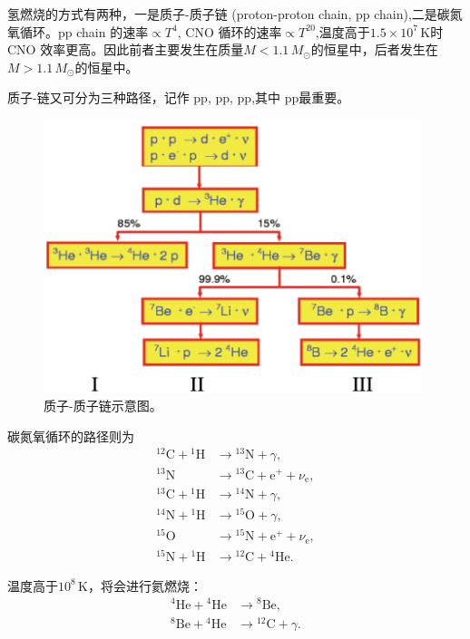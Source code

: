 \documentclass[../天体物理基础.tex]{subfiles}
\begin{document}
氢燃烧的方式有两种，一是质子{}-{}质子链 (proton-proton chain, pp chain),二是碳氮氧循环。pp chain 的速率$\propto T^{4}$, CNO 循环的速率$\propto{}T^{20}$,温度高于$1.5\times10^{7}\,\mathrm{K}$时 CNO 效率更高。因此前者主要发生在质量$M<1.1\,M_{\odot}$的恒星中，后者发生在$M>1.1\,M_{\odot}$的恒星中。

质子{}-{}链又可分为三种路径，记作 pp\uppercase\expandafter{}, pp\uppercase\expandafter{}, pp\uppercase\expandafter{},其中 pp\uppercase\expandafter{}最重要。
\begin{figure}[!htbp]
\centering
\includegraphics[width=11cm]{figures/figure2_1.png}
\captionsetup{justification=raggedright, singlelinecheck=false}
\caption{质子{}-{}质子链示意图。}
\label{ppchain}
\end{figure}

碳氮氧循环的路径则为
\begin{align*}
{}^{12}\mathrm{C}+{}^{1}\mathrm{H}&\to{}^{13}\mathrm{N}+\gamma,\\
{}^{13}\mathrm{N}&\to{}^{13}\mathrm{C}+\mathrm{e}^{+}+\nu_{\mathrm{e}},\\
{}^{13}\mathrm{C}+{}^{1}\mathrm{H}&\to{}^{14}\mathrm{N}+\gamma,\\
{}^{14}\mathrm{N}+{}^{1}\mathrm{H}&\to{}^{15}\mathrm{O}+\gamma,\\
{}^{15}\mathrm{O}&\to{}^{15}\mathrm{N}+\mathrm{e}^{+}+\nu_{\mathrm{e}},\\
{}^{15}\mathrm{N}+{}^{1}\mathrm{H}&\to{}^{12}\mathrm{C}+{}^{4}\mathrm{He}.
\end{align*}

温度高于$10^{8}\,\mathrm{K}$，将会进行氦燃烧：
\begin{align*}
{}^{4}\mathrm{He}+{}^{4}\mathrm{He}&\to{}^{8}\mathrm{Be},\\
{}^{8}\mathrm{Be}+{}^{4}\mathrm{He}&\to{}^{12}\mathrm{C}+\gamma.
\end{align*}
\end{document}
